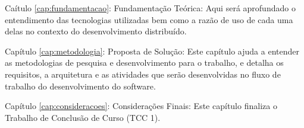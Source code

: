 Caítulo \ref{cap:fundamentacao}: Fundamentação Teórica: Aqui será aprofundado o entendimento das tecnologias utilizadas bem como a razão de uso de cada uma delas no contexto do desenvolvimento distribuído.

Capítulo \ref{cap:metodologia}: Proposta de Solução: Este capítulo ajuda a entender as metodologias de pesquisa e desenvolvimento para o trabalho, e detalha os requisitos, a arquitetura e as atividades que serão desenvolvidas no fluxo de trabalho do desenvolvimento do software.

Capítulo \ref{cap:consideracoes}: Considerações Finais: Este capítulo finaliza o Trabalho de Conclusão de Curso (TCC 1).